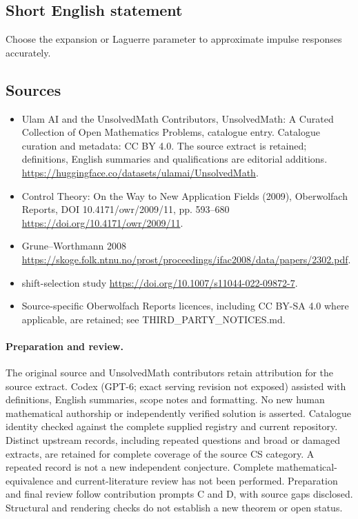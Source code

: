 \documentclass[11pt]{article}
\begin{document}
\subsection{Short English statement}
Choose the expansion or Laguerre parameter to approximate impulse responses accurately.
\subsection{Sources}
\begin{itemize}
\item[\hypertarget{source:statement:1}{S1}] Ulam AI and the UnsolvedMath Contributors, UnsolvedMath: A Curated Collection of Open Mathematics Problems, catalogue entry. Catalogue curation and metadata: CC BY 4.0. The source extract is retained; definitions, English summaries and qualifications are editorial additions.
\url{https://huggingface.co/datasets/ulamai/UnsolvedMath}.
\item[\hypertarget{source:statement:2}{S2}] Control Theory: On the Way to New Application Fields (2009), Oberwolfach Reports, DOI 10.4171/owr/2009/11, pp. 593--680
\url{https://doi.org/10.4171/owr/2009/11}.
\item[\hypertarget{source:statement:3}{S3}] Grune--Worthmann 2008
\url{https://skoge.folk.ntnu.no/prost/proceedings/ifac2008/data/papers/2302.pdf}.
\item[\hypertarget{source:statement:4}{S4}] shift-selection study
\url{https://doi.org/10.1007/s11044-022-09872-7}.
\item Source-specific Oberwolfach Reports licences, including CC BY-SA 4.0 where applicable, are retained; see THIRD\_PARTY\_NOTICES.md.
\end{itemize}
\paragraph{Preparation and review.}
The original source and UnsolvedMath contributors retain attribution for the source extract. Codex (GPT-6; exact serving revision not exposed) assisted with definitions, English summaries, scope notes and formatting. No new human mathematical authorship or independently verified solution is asserted. Catalogue identity checked against the complete supplied registry and current repository. Distinct upstream records, including repeated questions and broad or damaged extracts, are retained for complete coverage of the source CS category. A repeated record is not a new independent conjecture. Complete mathematical-equivalence and current-literature review has not been performed. Preparation and final review follow contribution prompts C and D, with source gaps disclosed. Structural and rendering checks do not establish a new theorem or open status.
\label{end:statement}
\end{document}
